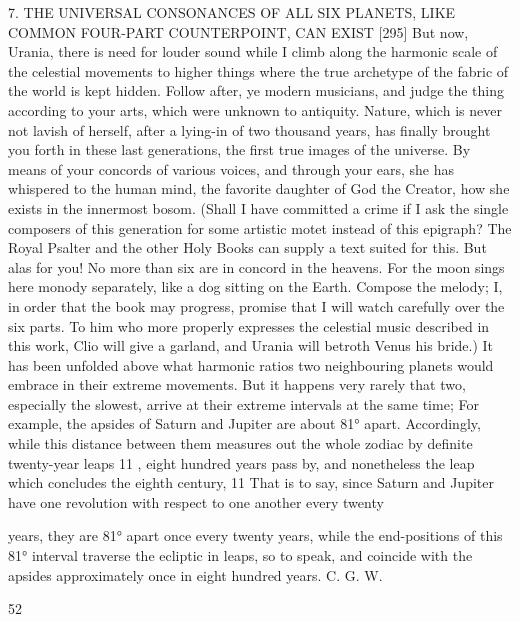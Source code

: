 \documentclass{article}
\begin{document}
7. THE UNIVERSAL CONSONANCES OF ALL SIX
PLANETS, LIKE COMMON FOUR-PART
COUNTERPOINT, CAN EXIST
[295] But now, Urania, there is need for louder sound while I climb
along the harmonic scale of the celestial movements to higher things
where the true archetype of the fabric of the world is kept hidden. Follow
after, ye modern musicians, and judge the thing according to your arts,
which were unknown to antiquity. Nature, which is never not lavish of
herself, after a lying-in of two thousand years, has finally brought you
forth in these last generations, the first true images of the universe. By
means of your concords of various voices, and through your ears, she has
whispered to the human mind, the favorite daughter of God the Creator,
how she exists in the innermost bosom.
(Shall I have committed a crime if I ask the single composers of this
generation for some artistic motet instead of this epigraph? The Royal
Psalter and the other Holy Books can supply a text suited for this. But
alas for you! No more than six are in concord in the heavens. For the
moon sings here monody separately, like a dog sitting on the Earth.
Compose the melody; I, in order that the book may progress, promise
that I will watch carefully over the six parts. To him who more properly
expresses the celestial music described in this work, Clio will give a
garland, and Urania will betroth Venus his bride.)
It has been unfolded above what harmonic ratios two neighbouring
planets would embrace in their extreme movements. But it happens very
rarely that two, especially the slowest, arrive at their extreme intervals at
the same time; For example, the apsides of Saturn and Jupiter are about
81° apart. Accordingly, while this distance between them measures out
the whole zodiac by definite twenty-year leaps 11 , eight hundred years
pass by, and nonetheless the leap which concludes the eighth century,
11 That is to say, since Saturn and Jupiter have one revolution with respect to one another every twenty

years, they are 81° apart once every twenty years, while the end-positions of this 81° interval traverse
the ecliptic in leaps, so to speak, and coincide with the apsides approximately once in eight hundred
years. C. G. W.


52
\end{document}
